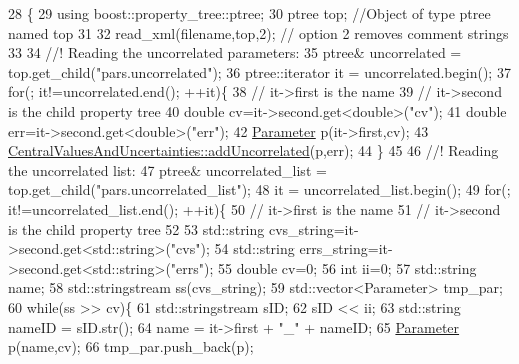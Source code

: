 \begin{DoxyCode}
28                                                                      \{
29     \textcolor{keyword}{using} boost::property\_tree::ptree;
30     ptree top;    \textcolor{comment}{//Object of type ptree named top}
31     
32     read\_xml(filename,top,2); \textcolor{comment}{// option 2 removes comment strings}
33     \textcolor{comment}{}
34 \textcolor{comment}{    //! Reading the uncorrelated parameters:}
35 \textcolor{comment}{}    ptree& uncorrelated = top.get\_child(\textcolor{stringliteral}{"pars.uncorrelated"});    
36     ptree::iterator it = uncorrelated.begin();
37     \textcolor{keywordflow}{for}(; it!=uncorrelated.end(); ++it)\{
38       \textcolor{comment}{// it->first is the name}
39       \textcolor{comment}{// it->second is the child property tree}
40       \textcolor{keywordtype}{double} cv=it->second.get<\textcolor{keywordtype}{double}>(\textcolor{stringliteral}{"cv"});
41       \textcolor{keywordtype}{double} err=it->second.get<\textcolor{keywordtype}{double}>(\textcolor{stringliteral}{"err"});
42       \hyperlink{namespace_neutrino_flux_reweight_aa1e1a244ea4addfb793b4e316e6c0a72}{Parameter} p(it->first,cv);
43       \hyperlink{class_neutrino_flux_reweight_1_1_central_values_and_uncertainties_a90995e11727bdcddcd18f912374f0aeb}{CentralValuesAndUncertainties::addUncorrelated}(p,err);
44     \}
45 \textcolor{comment}{}
46 \textcolor{comment}{    //! Reading the uncorrelated list:}
47 \textcolor{comment}{}    ptree& uncorrelated\_list = top.get\_child(\textcolor{stringliteral}{"pars.uncorrelated\_list"});
48     it = uncorrelated\_list.begin();
49     \textcolor{keywordflow}{for}(; it!=uncorrelated\_list.end(); ++it)\{
50       \textcolor{comment}{// it->first is the name}
51       \textcolor{comment}{// it->second is the child property tree}
52 
53       std::string cvs\_string=it->second.get<std::string>(\textcolor{stringliteral}{"cvs"});
54       std::string errs\_string=it->second.get<std::string>(\textcolor{stringliteral}{"errs"});
55       \textcolor{keywordtype}{double} cv=0;
56       \textcolor{keywordtype}{int} ii=0;
57       std::string name;
58       std::stringstream ss(cvs\_string);
59       std::vector<Parameter> tmp\_par;
60       \textcolor{keywordflow}{while}(ss >> cv)\{
61         std::stringstream sID;
62         sID << ii;
63         std::string nameID = sID.str();
64         name = it->first + \textcolor{stringliteral}{"\_"} + nameID;
65         \hyperlink{namespace_neutrino_flux_reweight_aa1e1a244ea4addfb793b4e316e6c0a72}{Parameter} p(name,cv);
66         tmp\_par.push\_back(p);

\end{DoxyCode}
